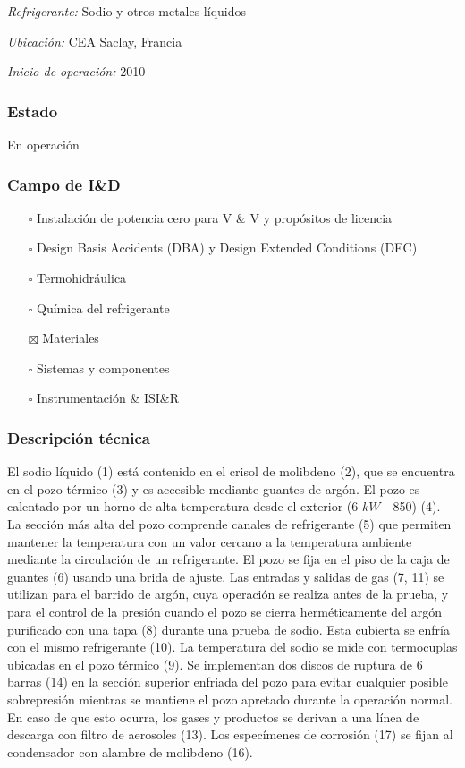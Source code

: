 \documentclass{article}
\begin{document}
\textit{Refrigerante: }Sodio y otros metales líquidos

\textit{Ubicación: }CEA Saclay, Francia

\textit{Inicio de operación: }2010

\subsubsection*{Estado}
En operación

\subsubsection*{Campo de I\&D}
\begin{itemize}
\item[$\square$] Instalación de potencia cero para V \& V y propósitos de licencia
\item[$\square$] Design Basis Accidents (DBA) y Design Extended Conditions (DEC)
\item[$\square$] Termohidráulica
\item[$\square$] Química del refrigerante
\item[$\boxtimes$] Materiales
\item[$\square$] Sistemas y componentes
\item[$\square$] Instrumentación \& ISI\&R
\end{itemize}
\subsubsection*{Descripción técnica}
El sodio líquido (1) está contenido en el crisol de molibdeno (2), que se encuentra en el pozo térmico (3) y es accesible mediante guantes de argón. El pozo es calentado por un horno de alta temperatura desde el exterior (6 $kW$ - 850\celsius) (4). La sección más alta del pozo comprende canales de refrigerante (5) que permiten mantener la temperatura con un valor cercano a la temperatura ambiente mediante la circulación de un refrigerante. El pozo se fija en el piso de la caja de guantes (6) usando una brida de ajuste. Las entradas y salidas de gas (7, 11) se utilizan para el barrido de argón, cuya operación se realiza antes de la prueba, y para el control de la presión cuando el pozo se cierra herméticamente del argón purificado con una tapa (8) durante una prueba de sodio. Esta cubierta se enfría con el mismo refrigerante (10). La temperatura del sodio se mide con termocuplas ubicadas en el pozo térmico (9). Se implementan dos discos de ruptura de 6 barras (14) en la sección superior enfriada del pozo para evitar cualquier posible sobrepresión mientras se mantiene el pozo apretado durante la operación normal. En caso de que esto ocurra, los gases y productos se derivan a una línea de descarga con filtro de aerosoles (13). Los especímenes de corrosión (17) se fijan al condensador con alambre de molibdeno (16).
\end{document}
